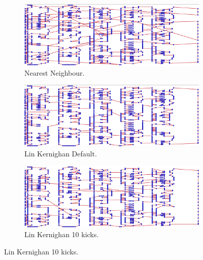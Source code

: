 \documentclass[13pt,a4paper]{article}
\begin{document}
\begin{figure}[t]
    \begin{subfigure}[t]{0.3\textwidth}
        \centering
        \includegraphics[width=\textwidth]{img/2/N.png}
        \caption{Nearest Neighbour.}
    \end{subfigure}
    \begin{subfigure}[t]{0.3\textwidth}
        \centering
        \includegraphics[width=\textwidth]{img/2/L1.png}
        \caption{Lin Kernighan Default.}
    \end{subfigure}
    \begin{subfigure}[t]{0.3\textwidth}
        \centering
        \includegraphics[width=\textwidth]{img/2/L10.png}
        \caption{Lin Kernighan 10 kicks.}
    \end{subfigure}


\end{figure}
\end{document}
